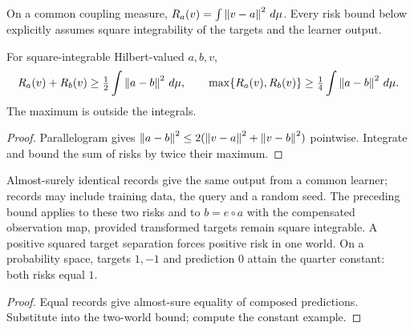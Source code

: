 \begin{definition}\label{def:identifiability-risk}
  \leanok
  On a common coupling measure, $R_a(v)=\int\left\lVert v-a\right\rVert^2\,d\mu$.
  Every risk bound below explicitly assumes square integrability of the targets
  and the learner output.
\end{definition}

\begin{theorem}\label{thm:identifiability-risk}
  \leanok
  For square-integrable Hilbert-valued $a,b,v$,
  \[
    R_a(v)+R_b(v)\ge\tfrac12\int\left\lVert a-b\right\rVert^2\,d\mu,\qquad
    \max\{R_a(v),R_b(v)\}\ge\tfrac14\int\left\lVert a-b\right\rVert^2\,d\mu.
  \]
  The maximum is outside the integrals.
\end{theorem}
\begin{proof}\leanok
  Parallelogram gives $\left\lVert a-b\right\rVert^2\le2(\left\lVert v-a\right\rVert^2+\left\lVert v-b\right\rVert^2)$
  pointwise. Integrate and bound the sum of risks by twice their maximum.
\end{proof}

\begin{corollary}\label{thm:identifiability-records}
  \leanok
  Almost-surely identical records give the same output from a common learner;
  records may include training data, the query and a random seed. The preceding
  bound applies to these two risks and to $b=e\circ a$ with the compensated
  observation map, provided transformed targets remain square integrable.
  A positive squared target separation forces positive risk in one world.
  On a probability space, targets $1,-1$ and prediction $0$ attain the quarter
  constant: both risks equal $1$.
\end{corollary}
\begin{proof}\leanok
  Equal records give almost-sure equality of composed predictions. Substitute
  into the two-world bound; compute the constant example.
\end{proof}

